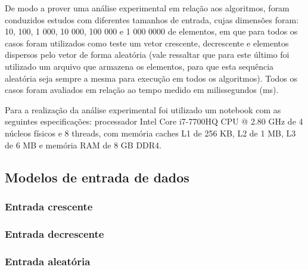 \documentclass[conference]{IEEEtran}
\begin{document}
De modo a prover uma análise experimental em relação aos algoritmos, foram conduzidos estudos com diferentes tamanhos de entrada, cujas dimensões foram: 10, 100, 1 000, 10 000, 100 000 e 1 000 0000 de elementos, em que para todos os casos foram utilizados como teste um vetor crescente, decrescente e elementos dispersos pelo vetor de forma aleatória (vale ressaltar que para este último foi utilizado um arquivo que armazena os elementos, para que esta sequência aleatória seja sempre a mesma para execução em todos os algoritmos). Todos os casos foram avaliados em relação ao tempo medido em milissegundos (ms).

Para a realização da análise experimental foi utilizado um notebook com as seguintes especificações: processador Intel Core i7-7700HQ CPU @ 2.80 GHz de 4 núcleos físicos e 8 threads, com memória
caches L1 de 256 KB, L2 de 1 MB, L3 de 6 MB e memória
RAM de 8 GB DDR4.


\subsection{Modelos de entrada de dados}

\subsubsection{Entrada crescente}







\subsubsection{Entrada decrescente}


\subsubsection{Entrada aleatória}


\end{document}
